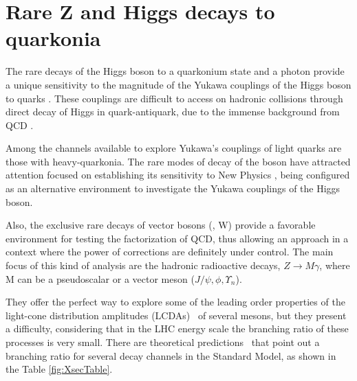 
\section{Rare Z and Higgs decays to quarkonia}
\label{section_rare_deays}

The rare decays of the Higgs boson \cite{higgs_discovery_atlas,higgs_discovery_cms} to a quarkonium state and a photon provide a unique sensitivity to the magnitude of the Yukawa couplings of the Higgs boson to quarks \cite{PhysRevD.88.053003, PhysRevD.90.113010,PhysRevLett.114.191803}. These couplings are difficult to access on hadronic collisions through direct decay of Higgs in quark-antiquark, due to the immense background from QCD \cite{PhysRevD.89.033014}. 

Among the channels available to explore Yukawa's couplings of light quarks \cite{PhysRevD.90.113010,PhysRevLett.114.191803} are those with heavy-quarkonia. The rare modes of decay of the \Z boson have attracted attention focused on establishing its sensitivity to New Physics \cite{PEREZ}, being configured as an alternative environment to investigate the Yukawa couplings of the Higgs boson.


Also, the exclusive rare decays of vector bosons (\Z, W) provide a favorable environment for testing the factorization of QCD, thus allowing an approach in a context where the power of corrections are definitely under control. The main focus of this kind of analysis are the hadronic radioactive decays, $Z\rightarrow M \gamma$, where M can be a pseudoscalar or a vector meson ($J/ \psi, \phi, \Upsilon_{n}$). 

They offer the perfect way to explore some of the leading order properties of the light-cone distribution amplitudes (LCDAs)~\cite{Grossman2015} of several mesons, but they present a difficulty, considering that in the LHC energy scale the branching ratio of these processes is very small. There are theoretical predictions~\cite{PhysRevD.97.016009,PhysRevD.96.116014} that point out a branching ratio for several decay channels in the Standard Model, as shown in the Table \ref{fig:XsecTable}.

